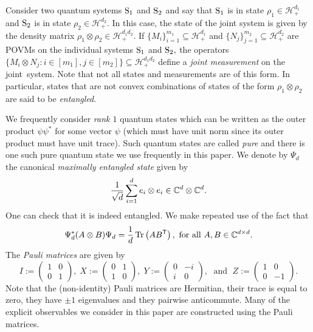 \documentclass{siamart}
\begin{document}
{{{{Consider two quantum systems ${\rm S_1}$ and ${\rm S_2}$ {and} say that ${\rm S_1}$ is in state $\rho_1 \in {\mathcal{H}}^{d_1}_+$ and {${\rm S_2}$ is in state}
$\rho_2 \in {\mathcal{H}}^{d_2}_+$.  In this case, the  state
of the joint system is given by the density matrix  $\rho_1\otimes \rho_2 \in {{\mathcal{H}}^{d_1 d_2}_+}$. {If}
$\{M_i\}_{i=1}^{m_1}\subseteq {\mathcal{H}}^{d_1}_+ $  and
$\{N_j\}_{j=1}^{m_2}\subseteq {\mathcal{H}}^{d_2}_+ $ are POVMs  on the
individual systems ${\rm S_1}$ and ${\rm S_2},$ the {operators}
$\{M_i\otimes N_j :i\in [m_1], j\in [m_2]\}\subseteq
{\mathcal{H}}_+^{d_1 d_2}$ define  a {\em {joint} measurement} on the
joint~system. {Note that not all states and measurements are of this form. {In particular, states that are not convex combinations of states of the form $\rho_1 \otimes \rho_2$ are said to be \emph{entangled}}.}

{We frequently consider \emph{rank $1$} quantum states which can be written as the outer product $\psi \psi^*$ for some vector $\psi$ (which must have unit norm since its outer product must have unit trace). Such quantum states are called \emph{pure} and there is one such pure quantum state we use frequently in this paper.} {We} denote by  $\Psi_d$ the  canonical {\em maximally entangled state} given by
\begin{equation}\label{eq:maxentangled}
{1\over \sqrt{d}}\sum_{i=1}^de_i\otimes e_i\in {\mathbb{C}}^d\otimes {\mathbb{C}}^d.
\end{equation}
{One can check that it is indeed entangled.}
We make repeated use of the fact that
\begin{equation}\label{eq:maxent}
\Psi_d^*(A\otimes B)\Psi_d= \frac{1}{d} \, {\mathrm{Tr}}\left(AB^{{\sf T}}\right), \text{ for all } A,B\in {\mathbb{C}}^{d\times d}.
\end{equation}
The {\em Pauli matrices} are given by
\[
{I:=
\begin{pmatrix}
1 & 0 \\
0 & 1
\end{pmatrix}}, \;
X:=
\begin{pmatrix}
0 & 1 \\
1 & 0
\end{pmatrix}, \;
Y:=\begin{pmatrix}
0 & -i \\
i  & 0
\end{pmatrix},
\; \text{ and } \;
Z:=
\begin{pmatrix}
1 & 0 \\
0 & -1
\end{pmatrix}. \]
Note that the {(non-identity)} Pauli matrices are Hermitian, their trace is equal to zero,  they have $\pm 1$ eigenvalues and they pairwise anticommute. {Many of the explicit observables we consider in this paper are constructed using the Pauli matrices.}

}}}}
\end{document}
